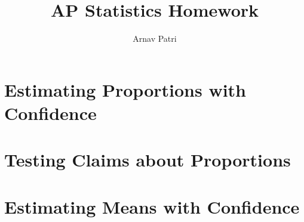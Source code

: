 \documentclass[12pt, A4]{report}
\title{AP Statistics Homework}
\author{Arnav Patri}
\begin{document}
	\maketitle
	\tableofcontents
	\setcounter{chapter}{7}
	\chapter{Estimating Proportions with Confidence}
		
	\chapter{Testing Claims about Proportions}
		
	\chapter{Estimating Means with Confidence}
		
\end{document}
